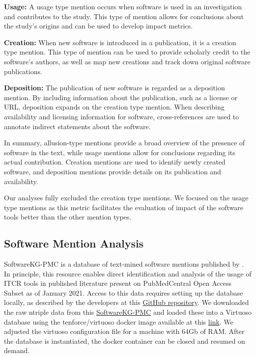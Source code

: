 \documentclass{article}
\begin{document}
\textbf{Usage:} A usage type mention occurs when software is used in an investigation and contributes to the study. This type of mention allows for conclusions about the study's origins and can be used to develop impact metrics. 
 
\textbf{Creation:} When new software is introduced in a publication, it is a creation type mention. This type of mention can be used to provide scholarly credit to the software's authors, as well as map new creations and track down original software publications.
 
\textbf{Deposition:} The publication of new software is regarded as a deposition mention. By including information about the publication, such as a license or URL, deposition expands on the creation type mention. When describing availability and licensing information for software, cross-references are used to annotate indirect statements about the software.
 
In summary, allusion-type mentions provide a broad overview of the presence of software in the text, while usage mentions allow for conclusions regarding its actual contribution. Creation mentions are used to identify newly created software, and deposition mentions provide details on its publication and availability.

Our analyses fully excluded the creation type mentions. We focused on the usage type mentions as this metric facilitates the evaluation of impact of the software tools better than the other mention types. 


\subsection{Software Mention Analysis}


SoftwareKG-PMC is a database of text-mined software mentions published by \cite{Kruger_usage_20}. In principle, this resource enables direct identification and analysis of the usage of ITCR tools in published literature present on PubMedCentral Open Access Subset as of January 2021. Access to this data requires setting up the database locally, as described by the developers at this \href{https://urldefense.com/v3/__https://github.com/f-krueger/SoftwareKG-PMC-Analysis__;!!GuAItXPztq0!hBzPcpXZ3SCNtkVgVI9KgwxhTOgm6JY1gKzCzCFfer1uhtTUx-sWnQyzKdfDCT0yogPVN8-gs4KZy97R-JH4PN6VNw20GNQ$}{GitHub repository}. We downloaded the raw ntriple data from this \href{https://urldefense.com/v3/__https://zenodo.org/record/7400022__;!!GuAItXPztq0!hBzPcpXZ3SCNtkVgVI9KgwxhTOgm6JY1gKzCzCFfer1uhtTUx-sWnQyzKdfDCT0yogPVN8-gs4KZy97R-JH4PN6VRftmtmY$}{SoftwareKG-PMC} and loaded these into a Virtuoso database using the tenforce/virtuoso docker image available at this \href{https://urldefense.com/v3/__https://hub.docker.com/r/tenforce/virtuoso/__;!!GuAItXPztq0!hBzPcpXZ3SCNtkVgVI9KgwxhTOgm6JY1gKzCzCFfer1uhtTUx-sWnQyzKdfDCT0yogPVN8-gs4KZy97R-JH4PN6V0PP1Kqo$}{link}. We adjusted the virtuoso configuration file for a machine with 64Gb of RAM. After the database is instantiated, the docker container can be closed and resumed on demand.
\end{document}
